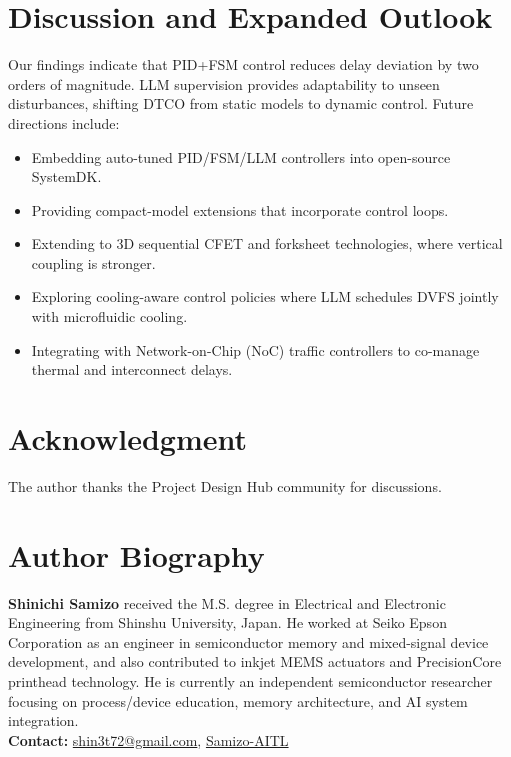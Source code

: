 \documentclass[conference]{IEEEtran}
\begin{document}
\section{Discussion and Expanded Outlook}
Our findings indicate that PID+FSM control reduces delay deviation
by two orders of magnitude. LLM supervision provides adaptability to
unseen disturbances, shifting DTCO from static models to dynamic control.
Future directions include:
\begin{itemize}
  \item Embedding auto-tuned PID/FSM/LLM controllers into open-source SystemDK.
  \item Providing compact-model extensions that incorporate control loops.
  \item Extending to 3D sequential CFET and forksheet technologies,
  where vertical coupling is stronger.
  \item Exploring cooling-aware control policies where LLM schedules
  DVFS jointly with microfluidic cooling.
  \item Integrating with Network-on-Chip (NoC) traffic controllers
  to co-manage thermal and interconnect delays.
\end{itemize}

\section*{Acknowledgment}
The author thanks the Project Design Hub community for discussions.




\section*{Author Biography}
\noindent\textbf{Shinichi Samizo}
received the M.S. degree in Electrical and Electronic Engineering from Shinshu University, Japan.
He worked at Seiko Epson Corporation as an engineer in semiconductor memory and mixed-signal device development,
and also contributed to inkjet MEMS actuators and PrecisionCore printhead technology.
He is currently an independent semiconductor researcher focusing on process/device education,
memory architecture, and AI system integration.\\[2pt]
\textbf{Contact:} \href{mailto:shin3t72@gmail.com}{shin3t72@gmail.com},
\href{https://github.com/Samizo-AITL}{Samizo-AITL}
\end{document}
